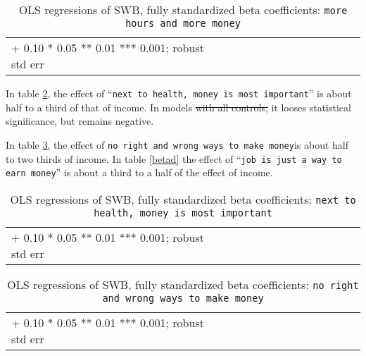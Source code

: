 \documentclass[10pt, letterpaper]{article}
\providecommand{\DIFaddtex}[1]{{\protect\color{blue}\uwave{#1}}} %
\providecommand{\DIFdeltex}[1]{{\protect\color{red}\sout{#1}}}                      %
\providecommand{\DIFaddbegin}{} %
\providecommand{\DIFaddend}{} %
\providecommand{\DIFdelbegin}{} %
\providecommand{\DIFdelend}{} %
\providecommand{\DIFadd}[1]{\texorpdfstring{\DIFaddtex{#1}}{#1}} %
\providecommand{\DIFdel}[1]{\texorpdfstring{\DIFdeltex{#1}}{}} %
\newcommand{\DIFscaledelfig}{0.5}
\newlength{\DIFdelgraphicswidth} %
\newlength{\DIFdelgraphicsheight} %
\newcommand{\DIFaddincludegraphics}[2][]{{\color{blue}\fbox{\DIFOincludegraphics[#1]{#2}}}} %
\newcommand{\DIFdelincludegraphics}[2][]{%
\sbox{\DIFdelgraphicsbox}{\DIFOincludegraphics[#1]{#2}}%
\settoboxwidth{\DIFdelgraphicswidth}{\DIFdelgraphicsbox} %
\settoboxtotalheight{\DIFdelgraphicsheight}{\DIFdelgraphicsbox} %
\scalebox{\DIFscaledelfig}{%
\parbox[b]{\DIFdelgraphicswidth}{\usebox{\DIFdelgraphicsbox}\\[-\baselineskip] \rule{\DIFdelgraphicswidth}{0em}}\llap{\resizebox{\DIFdelgraphicswidth}{\DIFdelgraphicsheight}{%
\setlength{\unitlength}{\DIFdelgraphicswidth}%
\begin{picture}(1,1)%
\thicklines\linethickness{2pt} %
{\color[rgb]{1,0,0}\put(0,0){\framebox(1,1){}}}%
{\color[rgb]{1,0,0}\put(0,0){\line( 1,1){1}}}%
{\color[rgb]{1,0,0}\put(0,1){\line(1,-1){1}}}%
\end{picture}%
}\hspace*{3pt}}} %
} %
\DeclareRobustCommand{\DIFaddbegin}{\DIFOaddbegin \let\includegraphics\DIFaddincludegraphics} %
\DeclareRobustCommand{\DIFaddend}{\DIFOaddend \let\includegraphics\DIFOincludegraphics} %
\DeclareRobustCommand{\DIFdelbegin}{\DIFOdelbegin \let\includegraphics\DIFdelincludegraphics} %
\DeclareRobustCommand{\DIFdelend}{\DIFOaddend \let\includegraphics\DIFOincludegraphics} %
\begin{document}
\begin{spacing}{1.8}
\begin{spacing}{.9} \begin{table}[H]\centering   \begin{scriptsize}  \begin{tabular}{p{2.3in}p{.5in}p{.5in}p{.5in}p{.5in}p{.5in}p{.5in}p{.5in}p{.5in}p{.5in}p{.5 in}p{.5in}p{.5 in}} \hline  \hline + 0.10 * 0.05 ** 0.01 *** 0.001; robust std err \end{tabular}\end{scriptsize}\caption{\label{betaa}OLS regressions of SWB, fully standardized beta coefficients: \texttt{more hours and more money}}\end{table} \end{spacing}

In table \ref{betab}, the effect of ``\texttt{next to  health, money is most
  important}'' is about half to a third of that of income. In models \DIFdelbegin \DIFdel{with all controls, }\DIFdelend \DIFaddbegin \DIFadd{b4 and b5 }\DIFaddend it looses statistical significance, but remains negative. 

In table \ref{betac}, the effect of \DIFaddbegin \DIFadd{``}\DIFaddend \texttt{no right  and wrong ways to make money}\DIFaddbegin \DIFadd{'' }\DIFaddend is about half to two thirds of income. In table \ref{betad} the effect of ``\texttt{job is just a way to earn money}'' is about a third to a half of the effect of income.

\begin{spacing}{.9} \begin{table}[H]\centering   \begin{scriptsize} \begin{tabular}{p{1.8in}p{.5in}p{.5in}p{.5in}p{.5in}p{.5in}p{.5in}p{.5in}p{.5in}p{.5in}p{.5 in}p{.5in}p{.5 in}}\hline  \hline + 0.10 * 0.05 ** 0.01 *** 0.001; robust std err \end{tabular}\end{scriptsize}\caption{\label{betab}OLS regressions of SWB, fully standardized beta coefficients: \texttt{next to  health, money is most  important}}\end{table} \end{spacing}

\begin{spacing}{.9} \begin{table}[H]\centering   \begin{scriptsize} \begin{tabular}{p{1.8in}p{.5in}p{.5in}p{.5in}p{.5in}p{.5in}p{.5in}p{.5in}p{.5in}p{.5in}p{.5 in}p{.5in}p{.5 in}}\hline  \hline + 0.10 * 0.05 ** 0.01 *** 0.001; robust std err \end{tabular}\end{scriptsize}\caption{\label{betac}OLS regressions of SWB, fully standardized beta coefficients: \texttt{no right  and wrong ways to  make money}}\end{table} \end{spacing}


\end{spacing}
\end{document}
